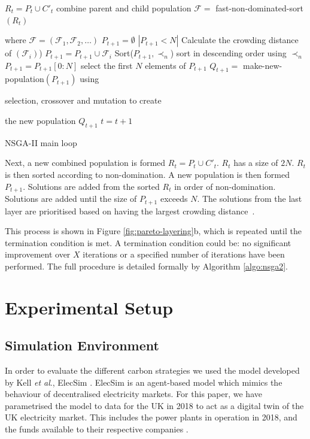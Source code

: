 \documentclass[sigconf]{acmart}
\begin{document}
\begin{algorithm}[b]
\begin{algorithmic}[1]
\State $R_t=P_t \cup C'_t$ combine parent and child population
\State $\mathcal{F} = $ fast-non-dominated-sort $(R_t)$ 

where $\mathcal{F}=(\mathcal{F}_1, \mathcal{F}_2,\ldots)$
\State $P_{t+1}=\emptyset$
\While $\left|P_{t+1}<N\right|$
\State Calculate the crowding distance of $(\mathcal{F}_i)$)
\State $P_{t+1}=P_{t+1}\cup \mathcal{F}_i$
\EndWhile
\State Sort($P_{t+1}, \prec_n$) sort in descending order using $\prec_n$
\State $P_{t+1} = P_{t+1}[0:N]$ select the first $N$ elements of $P_{t+1}$
\State $Q_{t+1} = $ make-new-population$(P_{t+1})$ using 

selection, crossover and mutation to create 

the new population $Q_{t+1}$
\State $t=t+1$
\caption{NSGA-II main loop \cite{Valkanas2014}}
\label{algo:nsga2}
\end{algorithmic}
\end{algorithm}


Next, a new combined population is formed $R_{t}=P_{t} \cup C'_{t}$. $R_t$ has a size of $2N$. $R_t$ is then sorted according to non-domination. A new population is then formed $P_{t+1}$. Solutions are added from the sorted $R_t$ in order of non-domination. Solutions are added until the size of $P_{t+1}$ exceeds $N$. The solutions from the last layer are prioritised based on having the largest crowding distance~\cite{Valkanas2014}.

This process is shown in Figure \ref{fig:pareto-layering}b, which is repeated until the termination condition is met. A termination condition could be:  no significant improvement over $X$ iterations or a specified number of iterations have been performed. The full procedure is detailed formally by Algorithm \ref{algo:nsga2}.



\section{Experimental Setup}
\label{sec:sim_environment}


\subsection{Simulation Environment}
In order to evaluate the different carbon strategies we used the model developed by Kell \textit{et al}., ElecSim \cite{Kell,Kell2020}. ElecSim is an agent-based model which mimics the behaviour of decentralised electricity markets. For this paper, we have parametrised the model to data for the UK in 2018 to act as a digital twin of the UK electricity market. This includes the power plants in operation in 2018, and the funds available to their respective companies \cite{dukes_511, companies_house}.
\end{document}
